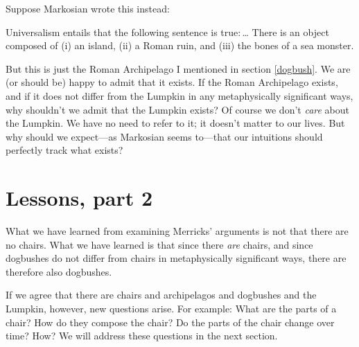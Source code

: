 \documentclass[11pt]{article}
\newenvironment{squote}{%
\begin{spacing}{1}
       	\begin{list}{}{%
\setlength{\labelwidth}{0pt}%
\rightmargin\leftmargin%
}
\item\relax
}{%
\end{list}%
\end{spacing}
}
\begin{document}
\begin{spacing}{1.25}
Suppose Markosian wrote this instead:

\begin{squote}
Universalism entails that the following sentence is true:\,\ldots
There is an object composed of (i) an island, (ii) a Roman ruin, and
(iii) the bones of a sea monster.
\end{squote}

But this is just the Roman Archipelago I mentioned in section
\ref{dogbush}.  We are (or should be) happy to admit that it exists.
If the Roman Archipelago exists, and if it does not differ from the
Lumpkin in any metaphysically significant ways, why shouldn't we admit
that the Lumpkin exists?  Of course we don't {\em care} about the
Lumpkin.  We have no need to refer to it; it doesn't matter to our
lives.  But why should we expect---as Markosian seems to---that our
intuitions should perfectly track what exists?

\section{Lessons, part 2}
\label{lessons-m}
What we have learned from examining Merricks' arguments is not that
there are no chairs.  What we have learned is that since there {\em
  are} chairs, and since dogbushes do not differ from chairs in
metaphysically significant ways, there are therefore also dogbushes.

If we agree that there are chairs and archipelagos and dogbushes and
the Lumpkin, however, new questions arise. For example: What are the
parts of a chair?  How do they compose the chair?  Do the parts of the
chair change over time?  How?  We will address these questions in the
next section.  

\ifstandalone
\end{spacing}


\fi
\end{document}

